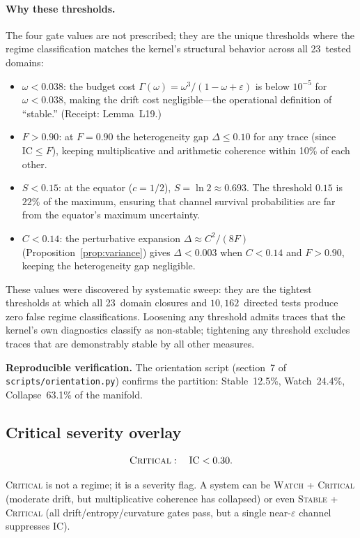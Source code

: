 \documentclass[
  aps,
  prd,
  twocolumn,
  superscriptaddress,
  nofootinbib,
  floatfix
]{revtex4-2}
\newcommand{\Gam}{\Gamma}
\newcommand{\eps}{\varepsilon}
\newcommand{\beq}{\begin{equation}}
\newcommand{\eeq}{\end{equation}}
\newcommand{\regime}[1]{\textrm{\upshape\scshape#1}}
\newcommand{\IC}{\mathrm{IC}}
\begin{document}
\paragraph{Why these thresholds.}
The four gate values are not prescribed; they are the unique
thresholds where the regime classification matches the
kernel's structural behavior across all 23~tested domains:
\begin{itemize}[leftmargin=*]
\item $\omega < 0.038$: the budget cost $\Gam(\omega) = \omega^3/(1{-}\omega+\eps)$
  is below $10^{-5}$ for $\omega < 0.038$, making the drift cost
  negligible---the operational definition of ``stable.''
  (Receipt: Lemma~L19.)
\item $F > 0.90$: at $F = 0.90$ the heterogeneity gap
  $\Delta \leq 0.10$ for any trace (since $\IC \leq F$), keeping
  multiplicative and arithmetic coherence within 10\% of each
  other.
\item $S < 0.15$: at the equator ($c = 1/2$),
  $S = \ln 2 \approx 0.693$.  The threshold $0.15$ is
  $22\%$ of the maximum, ensuring that channel survival
  probabilities are far from the equator's maximum uncertainty.
\item $C < 0.14$: the perturbative expansion
  $\Delta \approx C^2/(8F)$ (Proposition~\ref{prop:variance})
  gives $\Delta < 0.003$ when $C < 0.14$ and $F > 0.90$, keeping
  the heterogeneity gap negligible.
\end{itemize}
These values were discovered by systematic sweep: they are the
tightest thresholds at which all 23~domain closures and
$10{,}162$~directed tests produce zero false regime
classifications.  Loosening any threshold admits traces that the
kernel's own diagnostics classify as non-stable; tightening any
threshold excludes traces that are demonstrably stable by all
other measures.

\noindent\textbf{Reproducible verification.}
The orientation script (section~7 of
\texttt{scripts/orientation.py}) confirms the partition:
Stable~12.5\%, Watch~24.4\%, Collapse~63.1\% of the manifold.

\subsection{Critical severity overlay}

\beq
  \regime{Critical}: \quad \IC < 0.30.
\eeq

\regime{Critical} is not a regime; it is a severity flag.  A system
can be \regime{Watch} + \regime{Critical} (moderate drift, but
multiplicative coherence has collapsed) or even \regime{Stable} +
\regime{Critical} (all drift/entropy/curvature gates pass, but a
single near-$\eps$ channel suppresses $\IC$).
\end{document}
